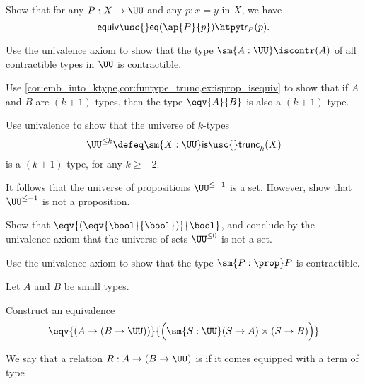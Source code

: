 \begin{exercises}
\item \label{ex:tr_ap} Show that for any $P:X\to \UU$ and any $p:x=y$ in $X$, we have
\begin{equation*}
\mathsf{equiv\usc{}eq}(\ap{P}{p})\htpy \mathsf{tr}_P(p).
\end{equation*}
\item 
\begin{subexenum}
\item Use the univalence axiom to show that the type $\sm{A:\UU}\iscontr(A)$ of all contractible types in $\UU$ is contractible.
\item Use \cref{cor:emb_into_ktype,cor:funtype_trunc,ex:isprop_isequiv} to show that if $A$ and $B$ are $(k+1)$-types, then the type $\eqv{A}{B}$ is also a $(k+1)$-type.
\item Use univalence to show that the universe of $k$-types
\begin{equation*}
\UU^{\leq k}\defeq \sm{X:\UU}\mathsf{is\usc{}trunc}_k(X)
\end{equation*}
is a $(k+1)$-type, for any $k\geq -2$.
\item It follows that the universe of propositions $\UU^{\leq-1}$ is a set. However, show that $\UU^{\leq-1}$ is not a proposition.
\item Show that $\eqv{(\eqv{\bool}{\bool})}{\bool}$, and conclude by the univalence axiom that the universe of sets $\UU^{\leq 0}$ is not a set. 
\end{subexenum}
\item Use the univalence axiom to show that the type $\sm{P:\prop}P$ is contractible.
\item Let $A$ and $B$ be small types. 
\begin{subexenum}
\item Construct an equivalence
\begin{equation*}
\eqv{(A\to (B\to\UU))}{\Big(\sm{S:\UU} (S\to A)\times (S\to B)\Big)}
\end{equation*}
\item We say that a relation $R:A\to (B\to\UU)$ is  if it comes equipped with a term of type
\begin{equation*}

\end{equation*}
\end{subexenum}
\end{exercises}
